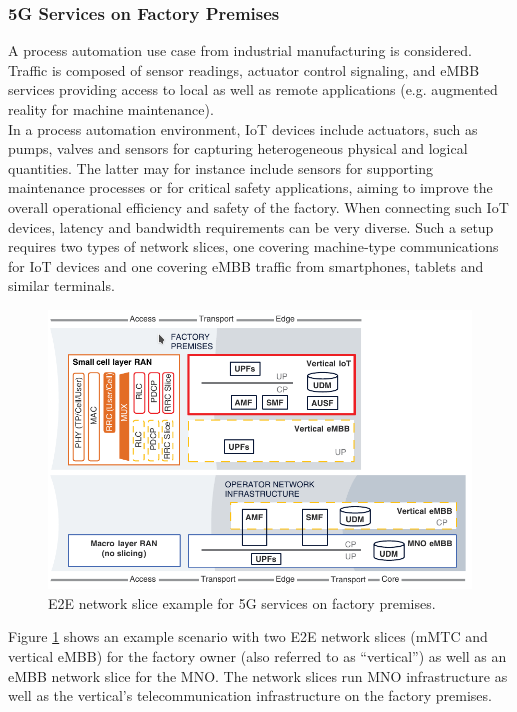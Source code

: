 \documentclass{report}
\begin{document}
\subsubsection{5G Services on Factory Premises}
A process automation use case from industrial manufacturing is considered. Traffic is composed of sensor readings, actuator control signaling, and eMBB services providing access to local as well as remote applications (e.g. augmented reality for machine maintenance).\\
In a process automation environment, \gls{IoT} devices include actuators, such as pumps, valves and
sensors for capturing heterogeneous physical and logical quantities. The latter may for instance include sensors for supporting maintenance processes or for critical safety
applications, aiming to improve the overall operational efficiency and safety of the factory. When
connecting such IoT devices, latency and bandwidth requirements can be very diverse. Such a setup
requires two types of network slices, one covering machine‐type communications for IoT devices
and one covering eMBB traffic from smartphones, tablets and similar terminals. 
\begin{figure}
\centering
\includegraphics[scale=0.56]{pics/example.png}
\caption{E2E network slice example for 5G services on factory premises. \cite{al20185g}}
\label{exem} 
\end{figure}
Figure \ref{exem} shows an example scenario with two E2E network slices (mMTC and vertical eMBB) for the factory owner (also
referred to as “vertical”) as well as an eMBB network slice for the MNO. The network slices run MNO infrastructure as well as the vertical’s telecommunication infrastructure on the factory premises.
\end{document}
